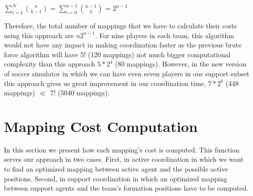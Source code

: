 \begin{center}
$\sum\limits_{i=1}^N{{n}\choose{k-1}}$ = $\sum\limits_{i=0}^{n-1}{{n-1}\choose{k}}$ = $2^{n-1}$
\end{center}
Therefore, the total number of mappings that we have to calculate their costs using this approach are $n2^{n-1}$. For nine players in each team, this algorithm would not have any impact in making coordination faster as the previous brute force algorithm will have 5! (120 mappings) not much bigger computational complexity than this approach $5 \ast 2^{4}$ (80 mappings). However, in the new version of soccer simulator in which we can have even seven players in our support subset this approach gives us great improvement in our coordination time, $7 \ast 2^{6}$ (448 mappings) $\ll$ 7! (5040 mappings).

\section{Mapping Cost Computation}
In this section we present how each mapping's cost is computed. This function serves our approach in two cases. First, in active coordination in which we want to find an optimized mapping between active agent and the possible active positions. Second, in support coordination in which an optimized mapping between support agents and the team's formation positions have to be computed.

